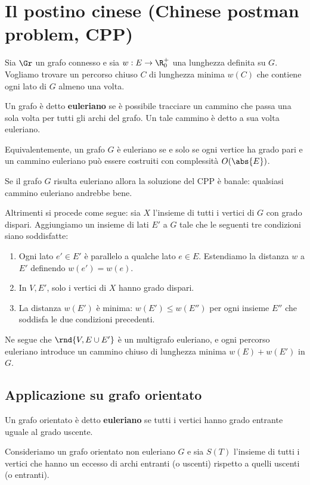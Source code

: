 \documentclass[\main/main.tex]{subfiles}
\begin{document}
\section{Il postino cinese (Chinese postman problem, CPP)}
Sia \(\Gr \) un grafo connesso e sia \(w: E \rightarrow \R^+_0\) una lunghezza definita su \(G\). Vogliamo trovare un percorso chiuso \(C\) di lunghezza minima \(w(C)\) che contiene ogni lato di \(G\) almeno una volta.
\begin{definition}
	Un grafo è detto \textbf{euleriano} se è possibile tracciare un cammino che passa una sola volta per tutti gli archi del grafo. Un tale cammino è detto a sua volta euleriano.

	Equivalentemente, un grafo \(G\) è euleriano se e solo se ogni vertice ha grado pari e un cammino euleriano può essere costruiti con complessità \(O(\abs{E})\).
\end{definition}
Se il grafo \(G\) risulta euleriano allora la soluzione del CPP è banale: qualsiasi cammino euleriano andrebbe bene.

Altrimenti si procede come segue: sia \(X\) l'insieme di tutti i vertici di \(G\) con grado dispari. Aggiungiamo un insieme di lati \(E'\) a \(G\) tale che le seguenti tre condizioni siano soddisfatte:
\begin{enumerate}
	\item Ogni lato \(e' \in E'\) è parallelo a qualche lato \(e \in E\). Estendiamo la distanza \(w\) a \(E'\) definendo \(w(e') = w(e)\).
	\item In \(V, E'\), solo i vertici di \(X\) hanno grado dispari.
	\item La distanza \(w(E')\) è minima: \(w(E') \leq w(E'')\) per ogni insieme \(E''\) che soddisfa le due condizioni precedenti.
\end{enumerate}
Ne segue che \(\rnd{V, E \cup E'}\) è un multigrafo euleriano, e ogni percorso euleriano introduce un cammino chiuso di lunghezza minima \(w(E) + w(E')\) in \(G\).

\subsection{Applicazione su grafo orientato}
\begin{definition}
	Un grafo orientato è detto \textbf{euleriano} se tutti i vertici hanno grado entrante uguale al grado uscente.
\end{definition}
Consideriamo un grafo orientato non euleriano \(G\) e sia \(S(T)\) l'insieme di tutti i vertici che hanno un eccesso di archi entranti (o uscenti) rispetto a quelli uscenti (o entranti).
\end{document}
